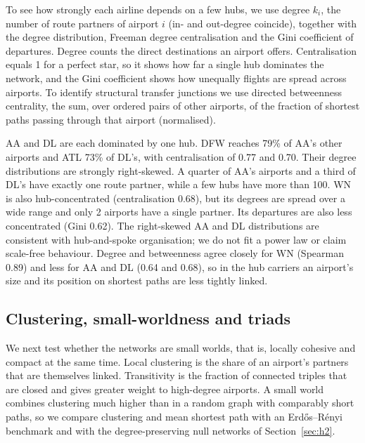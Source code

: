 \documentclass[12pt, a4paper]{article}
\begin{document}
To see how strongly each airline depends on a few hubs, we use degree $k_i$, the
number of route partners of airport $i$ (in- and out-degree coincide), together with
the degree distribution, Freeman degree centralisation \cite{freeman1978} and the Gini
coefficient of departures. Degree counts the direct destinations an airport offers.
Centralisation equals 1 for a perfect star, so it shows how far a single hub dominates
the network, and the Gini coefficient shows how unequally flights are spread across
airports. To identify structural transfer junctions we use directed betweenness centrality, the
sum, over ordered pairs of other airports, of the fraction of shortest paths passing through that airport (normalised).

AA and DL are each dominated by one hub. DFW reaches 79\% of AA's other airports and ATL
73\% of DL's, with centralisation of 0.77 and 0.70. Their degree distributions are
strongly right-skewed. A quarter of AA's airports and a third of DL's have exactly one
route partner, while a few hubs have more than 100. WN is also hub-concentrated
(centralisation 0.68), but its degrees are spread over a wide range and only 2
airports have a single partner. Its departures are also less concentrated (Gini 0.62).
The right-skewed AA and DL distributions are consistent with hub-and-spoke organisation; we do not fit a power law or claim scale-free behaviour. Degree and
betweenness agree closely for WN (Spearman 0.89) and less for AA and DL (0.64 and
0.68), so in the hub carriers an airport's size and its position on shortest paths are
less tightly linked.

\subsection{Clustering, small-worldness and triads}

We next test whether the networks are small worlds, that is, locally cohesive and
compact at the same time. Local clustering is the share of an airport's partners that
are themselves linked. Transitivity is the fraction of connected triples that are closed and gives greater weight to high-degree airports. A small world combines clustering much higher than in a
random graph with comparably short paths, so we compare clustering and mean shortest
path with an Erd\H{o}s--R\'enyi benchmark and with the degree-preserving null networks
of Section~\ref{sec:h2}.
\end{document}
